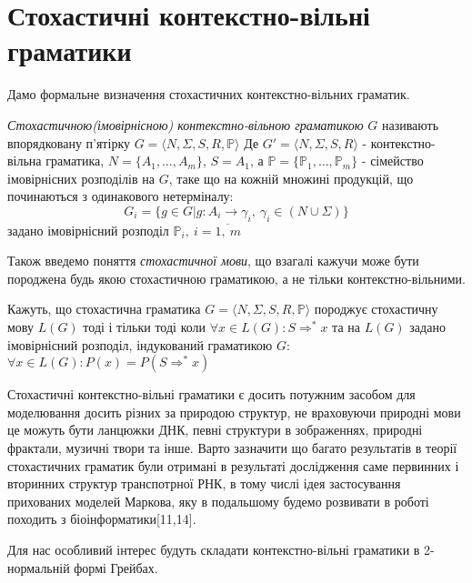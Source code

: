 \section{Стохастичні контекстно-вільні граматики}
 Дамо формальне визначення стохастичних контекстно-вільних граматик.
\begin{definition}
  \textit{Стохастичною(імовірнісною) контекстно-вільною граматикою} $ G $ називають впорядковану п'ятірку
  $ G = \big\langle N, \Sigma, S, R, \mathbb{P}\big\rangle $ Де $ G' = \big\langle N, \Sigma, S, R\big\rangle $ - контекстно-вільна граматика,
  $N = \{A_1,\dots,A_m \}$, $S = A_1$, а $\mathbb{P} = \{ \mathbb{P}_1,\dots,\mathbb{P}_m \}$ - сімейство імовірнісних розподілів на $G$,
  таке що на кожній множині продукцій, що починаються з одинакового нетерміналу:
  $$ G_i = \{ g \in G | g\colon A_i \rightarrow \gamma_i,\ \gamma_i \in \left(N \cup \Sigma \right) \} $$
  задано імовірнісний розподіл $\mathbb{P}_i,\ i = \overline{1,\ m}$
\end{definition}
Також введемо поняття \textit{стохастичної мови}, що взагалі кажучи може бути породжена будь якою стохастичною граматикою, а не тільки контекстно-вільними.
\begin{definition}
  Кажуть, що стохастична граматика $ G = \big\langle N, \Sigma, S, R, \mathbb{P}\big\rangle $ породжує стохастичну мову $ L(G) $ тоді і тільки тоді коли $ \forall x \in L(G) \colon S \Rightarrow^* x $ та на $ L(G) $ задано імовірнісний розподіл, індукований граматикою $ G $: $ \forall x \in L(G) \colon P(x) = P(S \Rightarrow^* x) $
\end{definition}

Стохастичні контекстно-вільні граматики є досить потужним засобом для моделювання досить різних за природою структур, не враховуючи природні мови це можуть бути ланцюжки ДНК, певні структури в зображеннях, природні фрактали, музичні твори та інше. Варто зазначити що багато результатів в теорії стохастичних граматик були отримані в результаті дослідження саме первинних і вторинних структур транспотрної РНК, в тому числі ідея застосування прихованих моделей Маркова, яку в подальшому будемо розвивати в роботі походить з біоінформатики[11,14].

Для нас особливий інтерес будуть складати контекстно-вільні граматики в 2-нормальній формі Грейбах.

